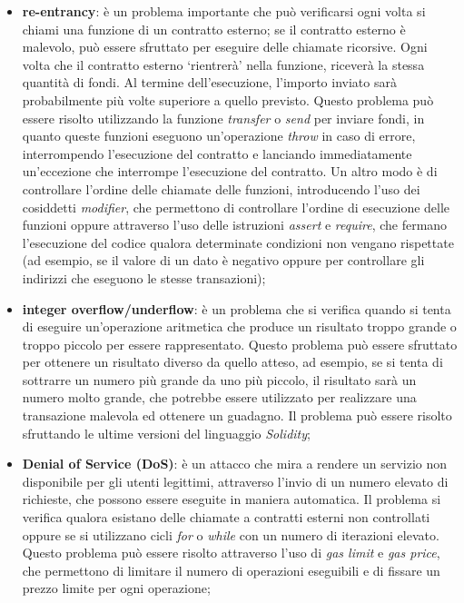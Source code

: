\begin{itemize}
    \item \textbf{re-entrancy}: è un problema importante che può verificarsi ogni volta si chiami una funzione di un contratto esterno; se il contratto esterno è malevolo, può essere sfruttato per eseguire
    delle chiamate ricorsive. Ogni volta che il contratto esterno `rientrerà' nella funzione, riceverà la stessa quantità di fondi. Al termine dell'esecuzione, l'importo inviato sarà probabilmente più volte superiore a quello previsto.
    Questo problema può essere risolto utilizzando la funzione \textit{transfer} o \textit{send} per inviare fondi, in quanto queste funzioni eseguono un'operazione \textit{throw} in caso di errore, interrompendo l'esecuzione del contratto
    e lanciando immediatamente un'eccezione che interrompe l'esecuzione del contratto. Un altro modo è di controllare l'ordine delle chiamate delle funzioni, 
    introducendo l'uso dei cosiddetti \textit{modifier}, che permettono di controllare l'ordine di esecuzione delle funzioni oppure attraverso l'uso delle istruzioni \textit{assert} e \textit{require}, che fermano l'esecuzione del codice 
    qualora determinate condizioni non vengano rispettate (ad esempio, se il valore di un dato è negativo oppure per controllare gli indirizzi che eseguono le stesse transazioni);
    \item \textbf{integer overflow/underflow}: è un problema che si verifica quando si tenta di eseguire un'operazione aritmetica che produce un risultato troppo grande o troppo piccolo per essere rappresentato.
    Questo problema può essere sfruttato per ottenere un risultato diverso da quello atteso, ad esempio, se si tenta di sottrarre un numero più grande da uno più piccolo, il risultato sarà un numero molto grande, che potrebbe essere
    utilizzato per realizzare una transazione malevola ed ottenere un guadagno. Il problema può essere risolto sfruttando le ultime versioni del linguaggio \textit{Solidity};
    \item \textbf{Denial of Service (DoS)}: è un attacco che mira a rendere un servizio non disponibile per gli utenti legittimi, attraverso l'invio di un numero elevato di richieste, che possono essere eseguite in maniera
    automatica. Il problema si verifica qualora esistano delle chiamate a contratti esterni non controllati oppure se si utilizzano cicli \textit{for} o \textit{while} con un numero di iterazioni elevato. 
    Questo problema può essere risolto attraverso l'uso di \textit{gas limit} e \textit{gas price}, che permettono di limitare il numero di operazioni eseguibili e di fissare un prezzo limite per ogni operazione;

\end{itemize}
